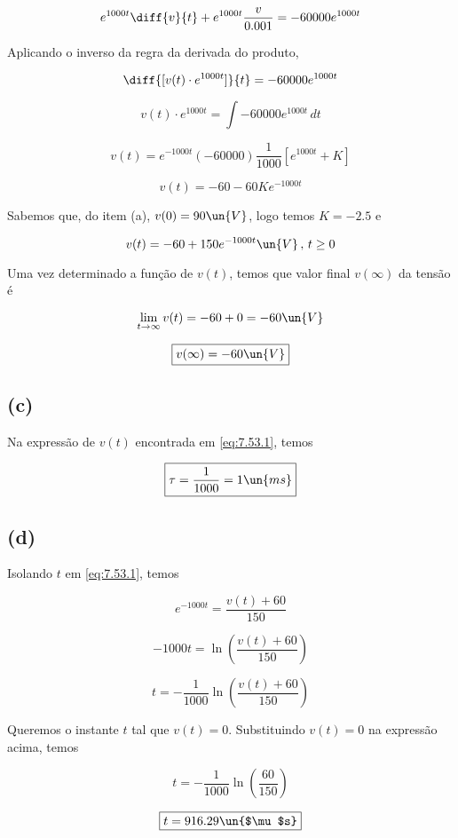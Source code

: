 \[ e^{1000t}\diff{v}{t} + e^{1000t}\frac{v}{0.001} = -60000 e^{1000t} \]

Aplicando o inverso da regra da derivada do produto,

\[ \diff{[v(t) \cdot e^{1000t}]}{t} = -60000 e^{1000t} \]

\[ v(t) \cdot e^{1000t} = \int -60000 e^{1000t} \, dt \]

\[ v(t) = e^{-1000t} (-60000) \frac{1}{1000} [ e^{1000t} + K ] \]

\[ v(t) = - 60 - 60Ke^{-1000t} \]

Sabemos que, do item (a), $v(0) = 90 \un{V}$, logo temos $K = -2.5$ e 

\begin{equation}\label{eq:7.53.1}
    v(t) = - 60 + 150 e^{-1000t} \un{V} \, , \, t \geq 0
\end{equation}

Uma vez determinado a função de $v(t)$, temos que valor final $v(\infty)$ da tensão é    

\[ \displaystyle \lim_{t\to \infty} v(t) = -60 + 0 = - 60 \un{V}  \]

\[ \boxed{v(\infty) = - 60 \un{V}} \]

\subsection*{(c)}

Na expressão de $v(t)$ encontrada em \eqref{eq:7.53.1}, temos 

\[ \boxed{ \tau = \frac{1}{1000} = 1 \un{ms}} \]

\subsection*{(d)}

Isolando $t$ em \eqref{eq:7.53.1}, temos 

\[ e^{-1000t} = \frac{v(t) + 60}{150} \]

\[ -1000t = \ln\left(\frac{v(t) + 60}{150}\right)  \]

\[ t = -\frac{1}{1000} \ln\left(\frac{v(t) + 60}{150}\right)  \]

Queremos o instante $t$ tal que $v(t) = 0$. Substituindo $v(t) = 0$ na expressão acima, temos

\[ t = -\frac{1}{1000} \ln\left(\frac{60}{150}\right)  \]

\[ \boxed{ t = 916.29 \un{$\mu$s}} \]





